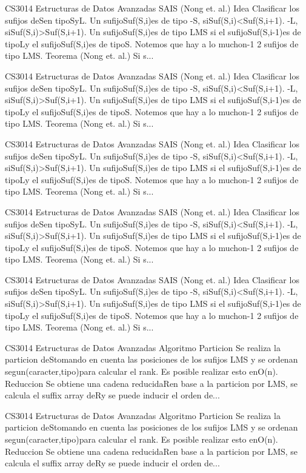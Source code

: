 \begin{description}[leftmargin=!,labelwidth=4.2em,style=nextline]
\item[Pag. 46] CS3014 Estructuras de Datos Avanzadas SAIS (Nong et. al.) Idea Clasificar los sufijos deSen tipoSyL. Un sufijoSuf(S,i)es de tipo -S, siSuf(S,i)<Suf(S,i+1). -L, siSuf(S,i)>Suf(S,i+1). Un sufijoSuf(S,i)es de tipo LMS si el sufijoSuf(S,i-1)es de tipoLy el sufijoSuf(S,i)es de tipoS. Notemos que hay a lo muchon-1 2 sufijos de tipo LMS. Teorema (Nong et. al.) Si s...
\item[Pag. 47] CS3014 Estructuras de Datos Avanzadas SAIS (Nong et. al.) Idea Clasificar los sufijos deSen tipoSyL. Un sufijoSuf(S,i)es de tipo -S, siSuf(S,i)<Suf(S,i+1). -L, siSuf(S,i)>Suf(S,i+1). Un sufijoSuf(S,i)es de tipo LMS si el sufijoSuf(S,i-1)es de tipoLy el sufijoSuf(S,i)es de tipoS. Notemos que hay a lo muchon-1 2 sufijos de tipo LMS. Teorema (Nong et. al.) Si s...
\item[Pag. 48] CS3014 Estructuras de Datos Avanzadas SAIS (Nong et. al.) Idea Clasificar los sufijos deSen tipoSyL. Un sufijoSuf(S,i)es de tipo -S, siSuf(S,i)<Suf(S,i+1). -L, siSuf(S,i)>Suf(S,i+1). Un sufijoSuf(S,i)es de tipo LMS si el sufijoSuf(S,i-1)es de tipoLy el sufijoSuf(S,i)es de tipoS. Notemos que hay a lo muchon-1 2 sufijos de tipo LMS. Teorema (Nong et. al.) Si s...
\item[Pag. 49] CS3014 Estructuras de Datos Avanzadas SAIS (Nong et. al.) Idea Clasificar los sufijos deSen tipoSyL. Un sufijoSuf(S,i)es de tipo -S, siSuf(S,i)<Suf(S,i+1). -L, siSuf(S,i)>Suf(S,i+1). Un sufijoSuf(S,i)es de tipo LMS si el sufijoSuf(S,i-1)es de tipoLy el sufijoSuf(S,i)es de tipoS. Notemos que hay a lo muchon-1 2 sufijos de tipo LMS. Teorema (Nong et. al.) Si s...
\item[Pag. 50] CS3014 Estructuras de Datos Avanzadas SAIS (Nong et. al.) Idea Clasificar los sufijos deSen tipoSyL. Un sufijoSuf(S,i)es de tipo -S, siSuf(S,i)<Suf(S,i+1). -L, siSuf(S,i)>Suf(S,i+1). Un sufijoSuf(S,i)es de tipo LMS si el sufijoSuf(S,i-1)es de tipoLy el sufijoSuf(S,i)es de tipoS. Notemos que hay a lo muchon-1 2 sufijos de tipo LMS. Teorema (Nong et. al.) Si s...
\item[Pag. 51] CS3014 Estructuras de Datos Avanzadas Algoritmo Particion Se realiza la particion deStomando en cuenta las posiciones de los sufijos LMS y se ordenan segun(caracter,tipo)para calcular el rank. Es posible realizar esto enO(n). Reduccion Se obtiene una cadena reducidaRen base a la particion por LMS, se calcula el suffix array deRy se puede inducir el orden de...
\item[Pag. 52] CS3014 Estructuras de Datos Avanzadas Algoritmo Particion Se realiza la particion deStomando en cuenta las posiciones de los sufijos LMS y se ordenan segun(caracter,tipo)para calcular el rank. Es posible realizar esto enO(n). Reduccion Se obtiene una cadena reducidaRen base a la particion por LMS, se calcula el suffix array deRy se puede inducir el orden de...

\end{description}
